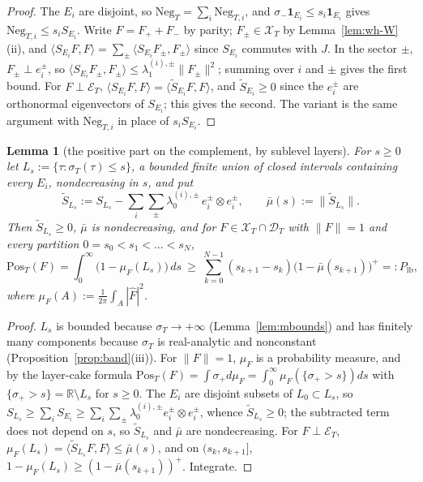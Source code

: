 \documentclass[11pt]{amsart}
\newtheorem{lemma}[theorem]{Lemma}
\theoremstyle{definition}
\theoremstyle{remark}
\newcommand{\R}{\mathbb R}
\newcommand{\sT}{\sigma_T}
\newcommand{\Fh}{\widehat F}
\begin{document}
\begin{proof}
The $E_i$ are disjoint, so $\mathrm{Neg}_T=\sum_i\mathrm{Neg}_{T,i}$, and $\sigma_-\mathbf 1_{E_i}\le s_i\mathbf 1_{E_i}$ gives
$\mathrm{Neg}_{T,i}\le s_iS_{E_i}$. Write $F=F_++F_-$ by parity; $F_\pm\in\mathcal X_T$ by Lemma~\ref{lem:wh-W}(ii), and
$\langle S_{E_i}F,F\rangle=\sum_\pm\langle S_{E_i}F_\pm,F_\pm\rangle$ since $S_{E_i}$ commutes with $J$. In the sector $\pm$,
$F_\pm\perp e^\pm_i$, so $\langle S_{E_i}F_\pm,F_\pm\rangle\le\lambda^{(i),\pm}_1\|F_\pm\|^2$; summing over $i$ and $\pm$ gives the
first bound. For $F\perp\mathcal E_T$, $\langle S_{E_i}F,F\rangle=\langle\widetilde S_{E_i}F,F\rangle$, and $\widetilde S_{E_i}\ge0$ since the
$e^\pm_i$ are orthonormal eigenvectors of $S_{E_i}$; this gives the second. The variant is the same argument with
$\mathrm{Neg}_{T,i}$ in place of $s_iS_{E_i}$.
\end{proof}

\begin{lemma}[the positive part on the complement, by sublevel layers]\label{lem:wh-pos}
For $s\ge0$ let $L_s:=\{\tau:\sT(\tau)\le s\}$, a bounded finite union of closed intervals containing every $E_i$,
nondecreasing in $s$, and put
\[
\widetilde S_{L_s}:=S_{L_s}-\sum_i\sum_\pm\lambda^{(i),\pm}_0\,e^\pm_i\otimes e^\pm_i,\qquad \bar\mu(s):=\|\widetilde S_{L_s}\| .
\]
Then $\widetilde S_{L_s}\ge0$, $\bar\mu$ is nondecreasing, and for $F\in\mathcal X_T\cap\mathcal D_T$ with $\|F\|=1$ and every
partition $0=s_0<s_1<\dots<s_N$,
\[
\mathrm{Pos}_T(F)=\int_0^\infty\big(1-\mu_F(L_s)\big)\,ds\ \ge\ \sum_{k=0}^{N-1}(s_{k+1}-s_k)\big(1-\bar\mu(s_{k+1})\big)^+=:P_{\mathrm{lb}},
\]
where $\mu_F(A):=\frac1{2\pi}\int_A|\Fh|^2$.
\end{lemma}

\begin{proof}
$L_s$ is bounded because $\sT\to+\infty$ (Lemma~\ref{lem:mbounds}) and has finitely many components because
$\sT$ is real-analytic and nonconstant (Proposition~\ref{prop:band}(iii)). For $\|F\|=1$, $\mu_F$ is a probability
measure, and by the layer-cake formula $\mathrm{Pos}_T(F)=\int\sigma_+d\mu_F=\int_0^\infty\mu_F(\{\sigma_+>s\})ds$ with
$\{\sigma_+>s\}=\R\setminus L_s$ for $s\ge0$. The $E_i$ are disjoint subsets of $L_0\subset L_s$, so
$S_{L_s}\ge\sum_iS_{E_i}\ge\sum_i\sum_\pm\lambda^{(i),\pm}_0e^\pm_i\otimes e^\pm_i$, whence $\widetilde S_{L_s}\ge0$; the
subtracted term does not depend on $s$, so $\widetilde S_{L_s}$ and $\bar\mu$ are nondecreasing. For $F\perp\mathcal E_T$,
$\mu_F(L_s)=\langle\widetilde S_{L_s}F,F\rangle\le\bar\mu(s)$, and on $(s_k,s_{k+1}]$,
$1-\mu_F(L_s)\ge(1-\bar\mu(s_{k+1}))^+$. Integrate.
\end{proof}
\end{document}
